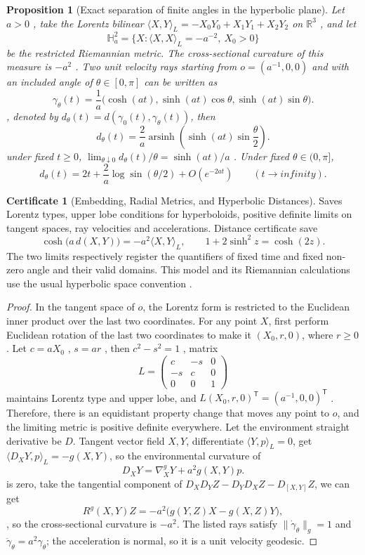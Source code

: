 \documentclass[12pt,a4paper,openany,notitlepage]{report}
\theoremstyle{plain}
\newtheorem{proposition}[theorem]{Proposition}
\theoremstyle{definition}
\newtheorem*{certificate}{Certificate}
\theoremstyle{remark}
\def\infty{infinity}\def\Gamma{Gamma}\def\Phi{Phi}%
\begin{document}
\begin{CJK*}
\begin{proposition}
[Exact separation of finite angles in the hyperbolic plane]\label{exp:geo:prop:hyperbolic-separation}
Let $a>0$ , take the Lorentz bilinear $\langle X,Y\rangle_L=-X_0Y_0+X_1Y_1+X_2Y_2$ on $\mathbb R^3$ , and let \[
\mathbb H_a^2=\{X:\langle X,X\rangle_L=-a^{-2},\ X_0>0\}
\] be the restricted Riemannian metric. The cross-sectional curvature of this measure is $-a^2$ . Two unit velocity rays starting from $o=(a^{-1},0,0)$ and with an included angle of $\theta\in[0,\pi]$ can be written as \[
\gamma_\theta(t)=\frac1a
\bigl(\cosh(at),\sinh(at)\cos\theta,\sinh(at)\sin\theta\bigr).
\], denoted by $d_\theta(t)=d(\gamma_0(t),\gamma_\theta(t))$, then \begin{equation}
\label{exp:geo:eq:finite-angle}
d_\theta(t)=\frac2a\operatorname{arsinh}
\left(\sinh(at)\sin\frac\theta2\right).
\end{equation} under fixed $t\ge0$, $\lim_{\theta\downarrow0}d_\theta(t)/\theta=\sinh(at)/a$ . Under fixed $\theta\in(0,\pi]$, \[
d_\theta(t)=2t+\frac2a\log\sin(\theta/2)+O(e^{-2at})
\qquad(t\to\infty).
\]\end{proposition}
\begin{certificate}
[Embedding, Radial Metrics, and Hyperbolic Distances]Saves Lorentz types, upper lobe conditions for hyperboloids, positive definite limits on tangent spaces, ray velocities and accelerations. Distance certificate save \[
\cosh\bigl(a\,d(X,Y)\bigr)=-a^2\langle X,Y\rangle_L,
\qquad
1+2\sinh^2z=\cosh(2z).
\] The two limits respectively register the quantifiers of fixed time and fixed non-zero angle and their valid domains. This model and its Riemannian calculations use the usual hyperbolic space convention \cite{ExtLeeRiemann}.\end{certificate}
\begin{proof}
In the tangent space of $o$, the Lorentz form is restricted to the Euclidean inner product over the last two coordinates. For any point $X$, first perform Euclidean rotation of the last two coordinates to make it $(X_0,r,0)$, where $r\ge0$. Let $c=aX_0$ , $s=ar$ , then $c^2-s^2=1$ , matrix \[
L=\begin{pmatrix}c&-s&0\\-s&c&0\\0&0&1\end{pmatrix}
\] maintains Lorentz type and upper lobe, and $L(X_0,r,0)^{\mathsf T}=(a^{-1},0,0)^{\mathsf T}$ . Therefore, there is an equidistant property change that moves any point to $o$, and the limiting metric is positive definite everywhere. Let the environment straight derivative be $D$. Tangent vector field $X,Y$, differentiate $\langle Y,p\rangle_L=0$, get $\langle D_XY,p\rangle_L=-g(X,Y)$, so the environmental curvature of \[
D_XY=\nabla^g_XY+a^2g(X,Y)p.
\] is zero, take the tangential component of $D_XD_YZ-D_YD_XZ-D_{[X,Y]}Z$, we can get \[
R^g(X,Y)Z=-a^2\bigl(g(Y,Z)X-g(X,Z)Y\bigr),
\], so the cross-sectional curvature is $-a^2$. The listed rays satisfy $\lVert\dot\gamma_\theta\rVert_g=1$ and $\ddot\gamma_\theta=a^2\gamma_\theta$; the acceleration is normal, so it is a unit velocity geodesic.


\end{proof}
\end{CJK*}
\end{document}
